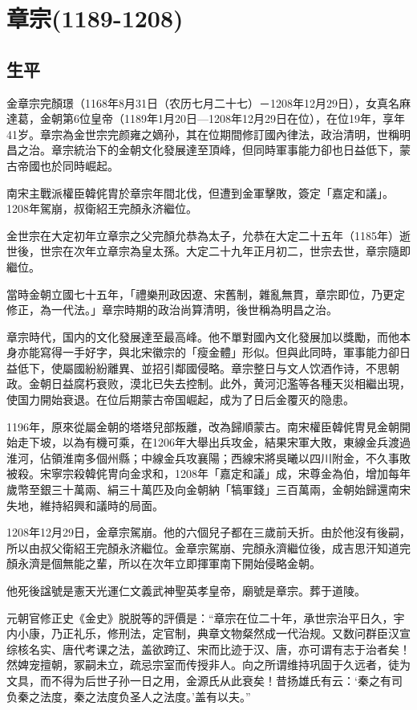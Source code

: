 
\section{章宗\tiny(1189-1208)}

\subsection{生平}

金章宗完顏璟（1168年8月31日（农历七月二十七）－1208年12月29日），女真名麻達葛，金朝第6位皇帝（1189年1月20日—1208年12月29日在位），在位19年，享年41岁。章宗為金世宗完颜雍之嫡孙，其在位期間修訂國內律法，政治清明，世稱明昌之治。章宗統治下的金朝文化發展達至頂峰，但同時軍事能力卻也日益低下，蒙古帝國也於同時崛起。

南宋主戰派權臣韓侂胄於章宗年間北伐，但遭到金軍擊敗，簽定「嘉定和議」。1208年駕崩，叔衛紹王完顏永济繼位。

金世宗在大定初年立章宗之父完顏允恭為太子，允恭在大定二十五年（1185年）逝世後，世宗在次年立章宗為皇太孫。大定二十九年正月初二，世宗去世，章宗隨即繼位。

當時金朝立國七十五年，「禮樂刑政因遼、宋舊制，雜亂無貫，章宗即位，乃更定修正，為一代法。」章宗時期的政治尚算清明，後世稱為明昌之治。

章宗時代，国内的文化發展達至最高峰。他不單對國內文化發展加以獎勵，而他本身亦能寫得一手好字，與北宋徽宗的「瘦金體」形似。但與此同時，軍事能力卻日益低下，使屬國紛紛離異、並招引鄰國侵略。章宗整日与文人饮酒作诗，不思朝政。金朝日益腐朽衰败，漠北已失去控制。此外，黄河氾濫等各種天災相繼出現，使国力開始衰退。在位后期蒙古帝国崛起，成为了日后金覆灭的隐患。

1196年，原來從屬金朝的塔塔兒部叛離，改為歸順蒙古。南宋權臣韓侂冑見金朝開始走下坡，以為有機可乘，在1206年大舉出兵攻金，結果宋軍大敗，東線金兵渡過淮河，佔領淮南多個州縣；中線金兵攻襄陽；西線宋將吳曦以四川附金，不久事敗被殺。宋寧宗殺韓侂冑向金求和，1208年「嘉定和議」成，宋尊金為伯，增加每年歲幣至銀三十萬兩、絹三十萬匹及向金朝納「犒軍錢」三百萬兩，金朝始歸還南宋失地，維持紹興和議時的局面。

1208年12月29日，金章宗駕崩。他的六個兒子都在三歲前夭折。由於他沒有後嗣，所以由叔父衛紹王完顏永济繼位。金章宗駕崩、完顏永濟繼位後，成吉思汗知道完顏永濟是個無能之輩，所以在次年立即揮軍南下開始侵略金朝。

他死後諡號是憲天光運仁文義武神聖英孝皇帝，廟號是章宗。葬于道陵。

元朝官修正史《金史》脱脱等的評價是：“章宗在位二十年，承世宗治平日久，宇内小康，乃正礼乐，修刑法，定官制，典章文物粲然成一代治规。又数问群臣汉宣综核名实、唐代考课之法，盖欲跨辽、宋而比迹于汉、唐，亦可谓有志于治者矣！然婢宠擅朝，冢嗣未立，疏忌宗室而传授非人。向之所谓维持巩固于久远者，徒为文具，而不得为后世子孙一日之用，金源氏从此衰矣！昔扬雄氏有云：‘秦之有司负秦之法度，秦之法度负圣人之法度。’盖有以夫。”

